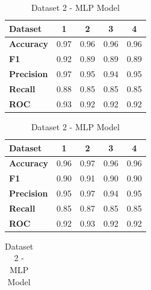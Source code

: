 \begin{table}[H]
  \centering
  \caption{MLP model cross-performance results}\label{tab:mlp_model_cross-performance_results}
  \begin{subtable}[H]{0.45\textwidth}
    \centering
    \begin{tabular}{|l|c|c|c|c|}
      \hline
      \textbf{Dataset}   & \textbf{1} & \textbf{2} & \textbf{3} & \textbf{4} \\
      \hline
      \textbf{Accuracy}  & 0.97       & 0.96       & 0.96       & 0.96       \\
      \textbf{F1}        & 0.92       & 0.89       & 0.89       & 0.89       \\
      \textbf{Precision} & 0.97       & 0.95       & 0.94       & 0.95       \\
      \textbf{Recall}    & 0.88       & 0.85       & 0.85       & 0.85       \\
      \textbf{ROC}       & 0.93       & 0.92       & 0.92       & 0.92       \\
      \hline
    \end{tabular}
    \caption{Dataset 1 - MLP Model}\label{subtab:dataset_1_mlp_model}
  \end{subtable}
  \quad
  \begin{subtable}[H]{0.45\textwidth}
    \centering
    \begin{tabular}{|l|c|c|c|c|}
      \hline
      \textbf{Dataset}   & \textbf{1} & \textbf{2} & \textbf{3} & \textbf{4} \\
      \hline
      \textbf{Accuracy}  & 0.96       & 0.97       & 0.96       & 0.96       \\
      \textbf{F1}        & 0.90       & 0.91       & 0.90       & 0.90       \\
      \textbf{Precision} & 0.95       & 0.97       & 0.94       & 0.95       \\
      \textbf{Recall}    & 0.85       & 0.87       & 0.85       & 0.85       \\
      \textbf{ROC}       & 0.92       & 0.93       & 0.92       & 0.92       \\
      \hline
    \end{tabular}
    \caption{Dataset 2 - MLP Model}\label{subtab:dataset_2_mlp_model}
  \end{subtable}
  \quad
  \begin{subtable}[H]{0.45\textwidth}
    \centering
    \begin{tabular}{|l|c|c|c|c|}

\end{tabular}
\end{subtable}
\end{table}
